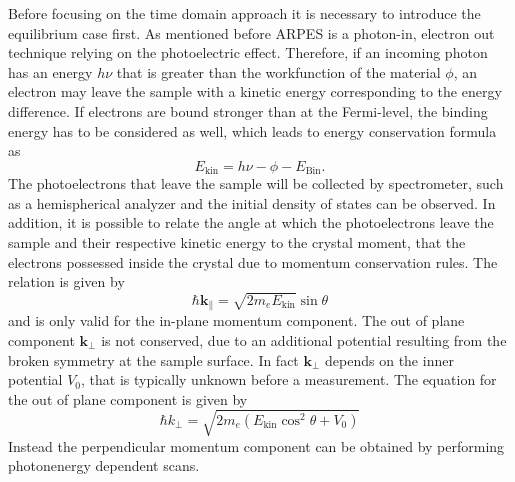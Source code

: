 Before focusing on the time domain approach it is necessary to introduce the equilibrium case first.
As mentioned before ARPES is a photon-in, electron out technique relying on the photoelectric effect.
Therefore, if an incoming photon has an energy $h\nu$ that is greater than the workfunction of the material $\phi$, an electron may leave the sample with a kinetic energy corresponding to the energy difference.
If electrons are bound stronger than at the Fermi-level, the binding energy has to be considered as well, which leads to energy conservation formula as
\begin{equation}
	E_\text{kin} = h\nu - \phi - E_\text{Bin}.
\end{equation}
The photoelectrons that leave the sample will be collected by spectrometer, such as a hemispherical analyzer and the initial density of states can be observed.
In addition, it is possible to relate the angle at which the photoelectrons leave the sample and their respective kinetic energy to the crystal moment, that the electrons possessed inside the crystal due to momentum conservation rules.
The relation is given by
\begin{equation}
	\hbar \mathbf{k}_\parallel = \sqrt{2m_eE_\text{kin}} \sin\theta
\end{equation}
and is only valid for the in-plane momentum component.
The out of plane component $\mathbf{k}_\perp$ is not conserved, due to an additional potential resulting from the broken symmetry at the sample surface.
In fact $\mathbf{k}_\perp$ depends on the inner potential $V_0$, that is typically unknown before a measurement.
The equation for the out of plane component is given by
\begin{equation}
	\hbar k_\perp = \sqrt{2m_e\left(E_\text{kin}\cos^2\theta+V_0\right)}
\end{equation}
Instead the perpendicular momentum component can be obtained by performing photonenergy dependent scans.

